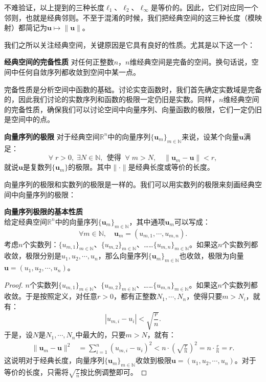 \documentclass[12pt,UTF8]{ctexbook}
\begin{document}
不难验证，以上提到的三种长度$\ell_1$、$\ell_2$、$\ell_{\infty}$是等价的。因此，它们对应同一个邻则，也就是经典邻则。不至于混淆的时候，我们把经典空间的这三种长度（模映射）都简记为$\mathbf{u}\mapsto \|\mathbf{u}\|$。

我们之所以关注经典空间，关键原因是它具有良好的性质。尤其是以下这一个：
\begin{tm}{\textbf{经典空间的完备性质}}\label{tm:0-4-20}
    对任何正整数$n$，$n$维经典空间是完备的空间。换句话说，空间中任何自敛序列都收敛到空间中某一点。
\end{tm}
完备性质是分析空间中函数的基础。讨论实变函数时，我们首先确定实数域是完备的，因此我们讨论的实数序列和函数的极限一定仍旧是实数。同样，$n$维经典空间的完备性质，确保我们可以讨论空间中向量序列、向量函数的极限，它们一定仍旧是空间中的点。

\begin{df}{\textbf{向量序列的极限}}
    对于经典空间$\mathbb{R}^n$中的向量序列$\{\mathbf{u}_m\}_{m\in\mathbb{N}}$来说，设某个向量$\mathbf{u}$满足：
    $$ \forall \;r > 0 ,\; \exists N\in \mathbb{N},\;\, \mbox{使得}\;\; \forall \; m>N, \quad \| \mathbf{u}_m - \mathbf{u} \| < r, $$
    就说$\mathbf{u}$是复数列$\{\mathbf{u}_m\}$的极限。其中$\|\cdot \|$是经典长度或等价的长度。
\end{df}

向量序列的极限和实数列的极限是一样的。我们可以用实数列的极限来刻画经典空间中向量序列的极限：
\begin{tm}\label{tm:0-4-30}
    \textbf{向量序列极限的基本性质}\\
    给定经典空间$\mathbb{R}^n$中的向量序列$\{\mathbf{u}_m\}_{m\in\mathbb{N}}$，其中通项$\mathbf{u}_m$可以写成：
    $$ \forall m\in\mathbb{N}, \quad \mathbf{u}_m = (u_{m,1}, \cdots, u_{m,n}).$$
    考虑$n$个实数列：$\{u_{m,1}\}_{m\in\mathbb{N}}$、$\{u_{m,2}\}_{m\in\mathbb{N}}$、……$\{u_{m,n}\}_{m\in\mathbb{N}}$。如果这$n$个实数列都收敛，极限分别是$u_1, u_2, \cdots, u_n$，那么向量序列$\{\mathbf{u}_m\}_{m\in\mathbb{N}}$也收敛，极限为向量$\mathbf{u} = (u_1, u_2, \cdots, u_n)$。
\end{tm}

\begin{proof}
    $n$个实数列$\{u_{m,1}\}_{m\in\mathbb{N}}$、$\{u_{m,2}\}_{m\in\mathbb{N}}$、……$\{u_{m,n}\}_{m\in\mathbb{N}}$。如果这$n$个实数列都收敛。于是按照定义，对任意$r>0$，都有正整数$N_1, \cdots, N_n$，使得只要$m>N_i$，就有：
    $$ |u_{m,i} - u_i| < \sqrt{\frac{r}{n}}.$$
    于是，设$N$是$N_1, \cdots, N_n$中最大的，只要$m>N$，就有：
    \begin{align*}
        \| \mathbf{u}_m - \mathbf{u} \|^2 &= \sum_{i=1}^n (u_{m,i} - u_i)^2 < n \cdot \left(\sqrt{\frac{r}{n}}\right)^2 = n \cdot \frac{r}{n} = r.
    \end{align*}
    这说明对于经典长度，向量序列$\{\mathbf{u}_m\}_{m\in\mathbb{N}}$收敛到极限$\mathbf{u} = (u_1, u_2, \cdots, u_n)$。对于等价的长度，只需将$\sqrt{\frac{r}{n}}$按比例调整即可。

\end{proof}
\end{document}
